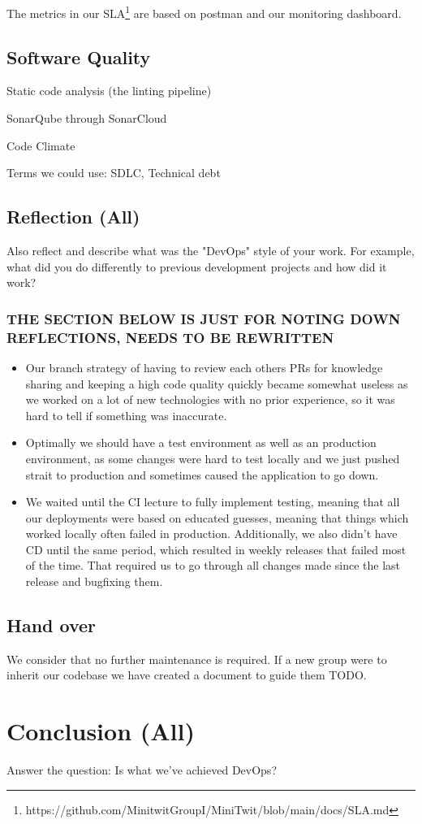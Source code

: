 \documentclass{article}
\begin{document}
The metrics in our SLA\footnote{https://github.com/MinitwitGroupI/MiniTwit/blob/main/docs/SLA.md} are based on postman and our monitoring dashboard. 





\subsection{Software Quality}



Static code analysis (the linting pipeline)

SonarQube through SonarCloud 

Code Climate

Terms we could use: SDLC, Technical debt


\subsection{Reflection (All)}

Also reflect and describe what was the "DevOps" style of your work. For example, what did you do differently to previous development projects and how did it work?


\subsubsection{THE SECTION BELOW IS JUST FOR NOTING DOWN REFLECTIONS, NEEDS TO BE REWRITTEN}
\begin{itemize}
    \item Our branch strategy of having to review each others PRs for knowledge sharing and keeping a high code quality quickly became somewhat useless as we worked on a lot of new technologies with no prior experience, so it was hard to tell if something was inaccurate. 
    \item Optimally we should have a test environment as well as an production environment, as some changes were hard to test locally and we just pushed strait to production and sometimes caused the application to go down.
    \item We waited until the CI lecture to fully implement testing, meaning that all our deployments were based on educated guesses, meaning that things which worked locally often failed in production. Additionally, we also didn't have CD until the same period, which resulted in weekly releases that failed most of the time. That required us to go through all changes made since the last release and bugfixing them.
\end{itemize}
 

\subsection{Hand over}

We consider that no further maintenance is required. If a new group were to inherit our codebase we have created a document to guide them TODO. 

\section{Conclusion (All)}

Answer the question: Is what we've achieved DevOps?



\end{document}

